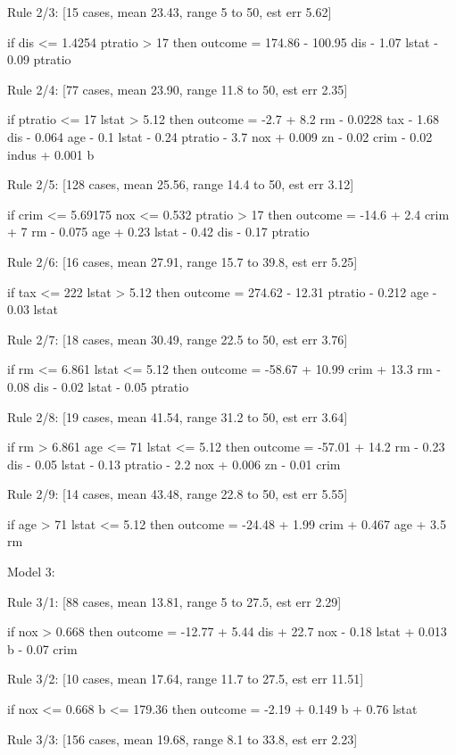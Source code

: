 \documentclass[12pt]{article}
\renewenvironment{Schunk}{\vspace{\topsep}}{\vspace{\topsep}}
\begin{document}
\begin{Schunk}
\begin{Soutput}
  Rule 2/3: [15 cases, mean 23.43, range 5 to 50, est err 5.62]

    if
	dis <= 1.4254
	ptratio > 17
    then
	outcome = 174.86 - 100.95 dis - 1.07 lstat - 0.09 ptratio

  Rule 2/4: [77 cases, mean 23.90, range 11.8 to 50, est err 2.35]

    if
	ptratio <= 17
	lstat > 5.12
    then
	outcome = -2.7 + 8.2 rm - 0.0228 tax - 1.68 dis - 0.064 age - 0.1 lstat
	          - 0.24 ptratio - 3.7 nox + 0.009 zn - 0.02 crim - 0.02 indus
	          + 0.001 b

  Rule 2/5: [128 cases, mean 25.56, range 14.4 to 50, est err 3.12]

    if
	crim <= 5.69175
	nox <= 0.532
	ptratio > 17
    then
	outcome = -14.6 + 2.4 crim + 7 rm - 0.075 age + 0.23 lstat - 0.42 dis
	          - 0.17 ptratio

  Rule 2/6: [16 cases, mean 27.91, range 15.7 to 39.8, est err 5.25]

    if
	tax <= 222
	lstat > 5.12
    then
	outcome = 274.62 - 12.31 ptratio - 0.212 age - 0.03 lstat

  Rule 2/7: [18 cases, mean 30.49, range 22.5 to 50, est err 3.76]

    if
	rm <= 6.861
	lstat <= 5.12
    then
	outcome = -58.67 + 10.99 crim + 13.3 rm - 0.08 dis - 0.02 lstat
	          - 0.05 ptratio

  Rule 2/8: [19 cases, mean 41.54, range 31.2 to 50, est err 3.64]

    if
	rm > 6.861
	age <= 71
	lstat <= 5.12
    then
	outcome = -57.01 + 14.2 rm - 0.23 dis - 0.05 lstat - 0.13 ptratio
	          - 2.2 nox + 0.006 zn - 0.01 crim

  Rule 2/9: [14 cases, mean 43.48, range 22.8 to 50, est err 5.55]

    if
	age > 71
	lstat <= 5.12
    then
	outcome = -24.48 + 1.99 crim + 0.467 age + 3.5 rm

Model 3:

  Rule 3/1: [88 cases, mean 13.81, range 5 to 27.5, est err 2.29]

    if
	nox > 0.668
    then
	outcome = -12.77 + 5.44 dis + 22.7 nox - 0.18 lstat + 0.013 b
	          - 0.07 crim

  Rule 3/2: [10 cases, mean 17.64, range 11.7 to 27.5, est err 11.51]

    if
	nox <= 0.668
	b <= 179.36
    then
	outcome = -2.19 + 0.149 b + 0.76 lstat

  Rule 3/3: [156 cases, mean 19.68, range 8.1 to 33.8, est err 2.23]


\end{Soutput}
\end{Schunk}
\end{document}
